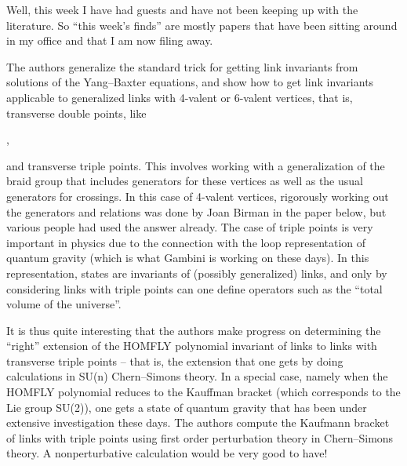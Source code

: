 

Well, this week I have had guests and have not been keeping up with the literature. So ``this week's finds'' are mostly papers that have been sitting around in my office and that I am now filing away.


The authors generalize the standard trick for getting link invariants from solutions of the Yang--Baxter equations, and show how to get link invariants applicable to generalized links with 4-valent or 6-valent vertices, that is, transverse double points, like
\begin{center}
,
\end{center}
and transverse triple points. This involves working with a generalization of the braid group that includes generators for these vertices as well as the usual generators for crossings. In this case of 4-valent vertices, rigorously working out the generators and relations was done by Joan Birman in the paper below, but various people had used the answer already. The case of triple points is very important in physics due to the connection with the loop representation of quantum gravity (which is what Gambini is working on these days). In this representation, states are invariants of (possibly generalized) links, and only by considering links with triple points can one define operators such as the ``total volume of the universe''.

It is thus quite interesting that the authors make progress on determining the ``right'' extension of the HOMFLY polynomial invariant of links to links with transverse triple points -- that is, the extension that one gets by doing calculations in SU(n) Chern--Simons theory. In a special case, namely when the HOMFLY polynomial reduces to the Kauffman bracket (which corresponds to the Lie group SU(2)), one gets a state of quantum gravity that has been under extensive investigation these days. The authors compute the Kaufmann bracket of links with triple points using first order perturbation theory in Chern--Simons theory. A nonperturbative calculation would be very good to have!

